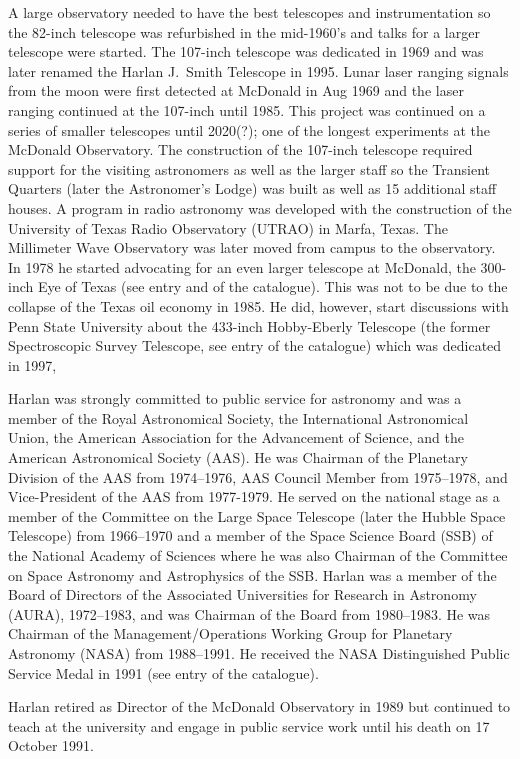 A large observatory needed to have the best telescopes and
instrumentation so the 82-inch telescope was refurbished in the
mid-1960's and talks for a larger telescope were started.  The
107-inch telescope was dedicated in 1969 and was later renamed the
Harlan J.~Smith Telescope in 1995. Lunar laser ranging signals from
the moon were first detected at McDonald in Aug 1969 and the laser
ranging continued at the 107-inch until 1985. This project was
continued on a series of smaller telescopes until 2020(?); one of the
longest experiments at the McDonald Observatory. The construction of
the 107-inch telescope required support for the visiting astronomers
as well as the larger staff so the Transient Quarters (later the
Astronomer's Lodge) was built as well as 15 additional staff houses. A
program in radio astronomy was developed with the construction of the
University of Texas Radio Observatory (UTRAO) in Marfa, Texas. The
Millimeter Wave Observatory was later moved from campus to the
observatory. In 1978 he started advocating for an even larger
telescope at McDonald, the 300-inch Eye of Texas (see
entry  and  of the catalogue). This was not to
be due to the collapse of the Texas oil economy in 1985. He did,
however, start discussions with Penn State University about the
433-inch Hobby-Eberly Telescope (the former Spectroscopic Survey
Telescope, see entry  of the catalogue) which was dedicated
in 1997,

Harlan was strongly committed to public service for astronomy and was
a member of the Royal Astronomical Society, the International
Astronomical Union, the American Association for the Advancement of
Science, and the American Astronomical Society (AAS). He was Chairman
of the Planetary Division of the AAS from 1974--1976, AAS Council
Member from 1975--1978, and Vice-President of the AAS from
1977-1979. He served on the national stage as a member of the
Committee on the Large Space Telescope (later the Hubble Space
Telescope) from 1966--1970 and a member of the Space Science Board
(SSB) of the National Academy of Sciences where he was also Chairman
of the Committee on Space Astronomy and Astrophysics of the
SSB. Harlan was a member of the Board of Directors of the Associated
Universities for Research in Astronomy (AURA), 1972--1983, and was
Chairman of the Board from 1980--1983. He was Chairman of the
Management/Operations Working Group for Planetary Astronomy (NASA)
from 1988--1991.  He received the NASA Distinguished Public Service
Medal in 1991 (see entry  of the catalogue).

Harlan retired as Director of the McDonald Observatory in 1989 but
continued to teach at the university and engage in public service work
until his death on 17 October 1991.


